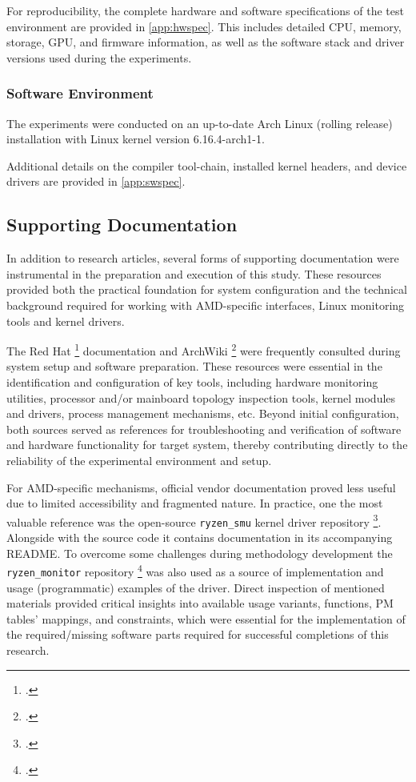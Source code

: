 For reproducibility, the complete hardware and software specifications of the
test environment are provided in \cref{app:hwspec}. This includes detailed
\gls{CPU}, memory, storage, \gls{GPU}, and firmware information, as well as
the software stack and driver versions used during the experiments.

\subsubsection{Software Environment}

The experiments were conducted on an up-to-date Arch Linux (rolling release)
installation with Linux kernel version 6.16.4-arch1-1.

Additional details on the compiler tool-chain, installed kernel headers, and
device drivers are provided in \cref{app:swspec}.

\subsection{Supporting Documentation}

In addition to research articles, several forms of supporting
documentation were instrumental in the preparation and execution of
this study. These resources provided both the practical foundation for
system configuration and the technical background required for working
with AMD-specific interfaces, Linux monitoring tools and kernel drivers.

The Red Hat \footcite{RedHat_Docs} documentation and ArchWiki \footcite{ArchWiki}
were frequently consulted during system setup and software preparation. These
resources were essential in the identification and configuration of key tools,
including hardware monitoring utilities, processor and/or mainboard topology
inspection tools, kernel modules and drivers, process management mechanisms, etc.
Beyond initial configuration, both sources served as references for
troubleshooting and verification of software and hardware functionality for
target system, thereby contributing directly to the reliability of the
experimental environment and setup.

For AMD-specific mechanisms, official vendor documentation proved less
useful due to limited accessibility and fragmented nature. In practice,
one the most valuable reference was the open-source \texttt{ryzen\_smu} kernel
driver repository \footcite{RyzenSMU_GitHub}. Alongside with the source code
it contains documentation in its accompanying README. To overcome some
challenges during methodology development the \texttt{ryzen\_monitor} repository
\footcite{RyzenMonitor_GitHub} was also used as a source of implementation and
usage (programmatic) examples of the driver. Direct inspection of mentioned
materials provided critical insights into available usage variants, functions,
\gls{PM} tables' mappings, and constraints, which were essential for the
implementation of the required/missing software parts required for successful
completions of this research.

